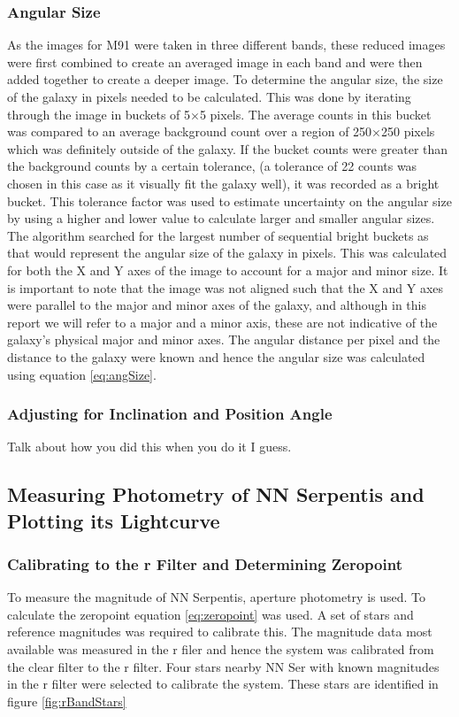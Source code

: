 \documentclass[%
reprint,
amsmath,amssymb,
aps,
]{revtex4-2}
\begin{document}
			\subsubsection{Angular Size}
			
				As the images for M91 were taken in three different bands, these reduced images were first combined to create an averaged image in each band and were then added together to create a deeper image. To determine the angular size, the size of the galaxy in pixels needed to be calculated. This was done by iterating through the image in buckets of 5$\times$5 pixels. The average counts in this bucket was compared to an average background count over a region of 250$\times$250 pixels which was definitely outside of the galaxy. If the bucket counts were greater than the background counts by a certain tolerance, (a tolerance of 22 counts was chosen in this case as it visually fit the galaxy well), it was recorded as a bright bucket. This tolerance factor was used to estimate uncertainty on the angular size by using a higher and lower value to calculate larger and smaller angular sizes.\\
				
				The algorithm searched for the largest number of sequential bright buckets as that would represent the angular size of the galaxy in pixels. This was calculated for both the X and Y axes of the image to account for a major and minor size. It is important to note that the image was not aligned such that the X and Y axes were parallel to the major and minor axes of the galaxy, and although in this report we will refer to a major and a minor axis, these are not indicative of the galaxy's physical major and minor axes. The angular distance per pixel and the distance to the galaxy were known and hence the angular size was calculated using equation \ref{eq:angSize}.
			
			\subsubsection{Adjusting for Inclination and Position Angle}
				Talk about how you did this when you do it I guess.
		
		\subsection{Measuring Photometry of NN Serpentis and Plotting its Lightcurve}
			
			\subsubsection{Calibrating to the r Filter and Determining Zeropoint}
				To measure the magnitude of NN Serpentis, aperture photometry is used. To calculate the zeropoint equation \ref{eq:zeropoint} was used. A set of stars and reference magnitudes was required to calibrate this. The magnitude data most available was measured in the r filer and hence the system was calibrated from the clear filter to the r filter. Four stars nearby NN Ser with known magnitudes in the r filter were selected to calibrate the system\cite{parsons}. These stars are identified in figure \ref{fig:rBandStars}
				
\end{document}
